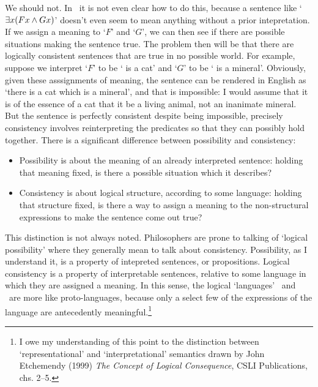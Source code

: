 \begin{earg}
We should not. In \FOL\ it is not even clear how to do this, because a sentence like `$\exists x (Fx \wedge Gx)$' doesn't even seem to mean anything without a prior intepretation. If we assign a meaning to `$F$' and `$G$', we can then see if there are possible situations making the sentence true. The problem then will be that there are logically consistent sentences that are true in no possible world. For example, suppose we interpret `$F$' to be `\gap{} is a cat' and `$G$' to be `\gap{} is a mineral'. Obviously, given these asssignments of meaning, the sentence can be rendered in English as `there is a cat which is a mineral', and that is impossible: I would assume that it is of the essence of a cat that it be a living animal, not an inanimate mineral. But the sentence is perfectly consistent despite being impossible, precisely consistency involves reinterpreting the predicates so that they can possibly hold together. There is a significant difference between possibility and consistency: \begin{itemize}
	\item Possibility is about the meaning of an already interpreted sentence: holding that meaning fixed, is there a possible situation which it describes?
	\item Consistency is about logical structure, according to some language: holding that structure fixed, is there a way to assign a meaning to the non-structural expressions to make the sentence come out true?
\end{itemize} This distinction is not always noted. Philosophers are prone to talking of `logical possibility' where they generally mean to talk about consistency. Possibility, as I understand it, is a property of intepreted sentences, or propositions. Logical consistency is a property of interpretable sentences, relative to some language in which they are assigned a meaning. In this sense, the logical `languages' \TFL\ and \FOL\ are more like proto-languages, because only a select few of the expressions of the language are antecedently meaningful.\footnote{I owe my understanding of this point to the distinction between `representational' and `interpretational' semantics drawn by John Etchemendy (1999) \emph{The Concept of Logical Consequence}, CSLI Publications, chs. 2–5.}




\end{earg}
